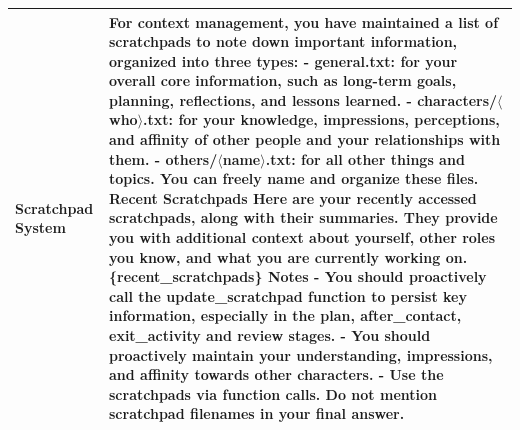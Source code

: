 \begin{table}[h]
\begin{tabular}{p{0.8in}p{4.3in}}
\\
\midrule

\textbf{Scratchpad System} &

For context management, you have maintained a list of scratchpads to note down important information, organized into three types:
\vspace{3pt}\newline
- \textbf{general.txt}: for your overall core information, such as long-term goals, planning, reflections, and lessons learned.
\newline - \textbf{characters/$\langle$who$\rangle$.txt}: for your knowledge, impressions, perceptions, and affinity of other people and your relationships with them.
\newline - \textbf{others/$\langle$name$\rangle$.txt}: for all other things and topics. You can freely name and organize these files.
\vspace{4pt}\newline
\textbf{Recent Scratchpads}
\newline Here are your recently accessed scratchpads, along with their summaries. They provide you with additional context about yourself, other roles you know, and what you are currently working on.
\newline \{recent\_scratchpads\}
\vspace{4pt}\newline
\textbf{Notes}
\newline - You should proactively call the update\_scratchpad function to persist key information, especially in the plan, after\_contact, exit\_activity and review stages.
\newline - You should proactively maintain your understanding, impressions, and affinity towards other characters.
\newline - Use the scratchpads via function calls. Do not mention scratchpad filenames in your final answer.

\\
\bottomrule
\end{tabular}
\end{table}



